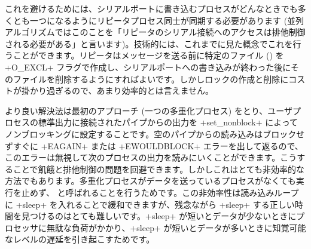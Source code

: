 これを避けるためには、シリアルポートに書き込むプロセスがどんなときでも多くとも一つになるようにリピータプロセス同士が同期する必要があります (並列アルゴリズムではこのことを「リピータのシリアル接続へのアクセスは排他制御される必要がある」と言います)。技術的には、これまでに見た概念でこれを行うことができます。リピータはメッセージを送る前に特定のファイル () を \ml+O_EXCL+ フラグで作成し、シリアルポートへの書き込みが終わった後にそのファイルを削除するようにすればよいです。しかしロックの作成と削除にコストが掛かり過ぎるので、あまり効率的とは言えません。

より良い解決法は最初のアプローチ (一つの多重化プロセス) をとり、ユーザプロセスの標準出力に接続されたパイプからの出力を \ml+set_nonblock+ によってノンブロッキングに設定することです。空のパイプからの読み込みはブロックせずすぐに \ml+EAGAIN+ または \ml+EWOULDBLOCK+ エラーを出して返るので、このエラーは無視して次のプロセスの出力を読みにいくことができます。こうすることで飢餓と排他制御の問題を回避できます。しかしこれはとても非効率的な方法でもあります。多重化プロセスがデータを送っているプロセスがなくても実行を止めず、 と呼ばれることを行うためです。この非効率性は読み込みループに \ml+sleep+ を入れることで緩和できますが、残念ながら \ml+sleep+ する正しい時間を見つけるのはとても難しいです。\ml+sleep+ が短いとデータが少ないときにプロセッサに無駄な負荷がかかり、\ml+sleep+ が短いとデータが多いときに知覚可能なレベルの遅延を引き起こすためです。

